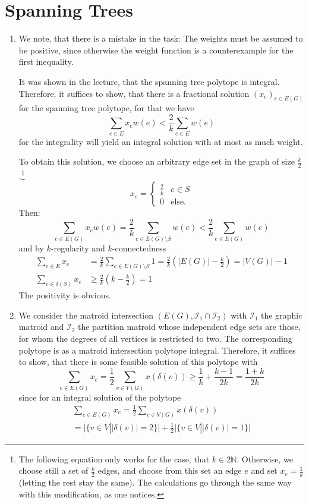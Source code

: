 \documentclass{scrartcl}
\newcommand\1{\mathbf{1}}
\begin{document}
\section{Spanning Trees}
\begin{enumerate}
\item
We note, that there is a mistake in the task: The weights must be assumed to be positive, since otherwise the weight function is a counterexample for the first inequality.

It was shown in the lecture, that the spanning tree polytope is integral. Therefore, it suffices to show, that there is a fractional solution $(x_e)_{e \in E(G)}$ for the spanning tree polytope, for that we have
\[
\sum_{e \in E} x_e w(e) < \frac{2}{k} \sum_{e \in E} w(e)
\]
for the integrality will yield an integral solution with at most as much weight.

To obtain this solution, we choose an arbitrary edge set in the graph of size $\frac{k}{2}$.\footnote{The following equation only works for the case, that $k\in 2\mathbb{N}$. Otherwise, we choose still a set of $\frac{k}{2}$ edges, and choose from this set an edge $e$ and set $x_e = \frac{1}{k}$ (letting the rest stay the same). The calculations go through the same way with this modification, as one notices.}
\[
x_e = \begin{cases} \frac{2}{k} & e \in S \\ 0 &\text{else.}\end{cases}
\]
Then:
\[
\sum_{e \in E(G)} x_e w(e) = \frac{2}{k}\sum_{e \in E(G) \setminus S} w(e) <  \frac{2}{k}\sum_{e \in E(G)} w(e)
\]
and by $k$-regularity and $k$-connectedness
\begin{align*}
\sum_{e \in E} x_e &= \frac{2}{k}\sum_{e \in E(G) \setminus S} 1 =\frac{2}{k}( \lvert E(G) \rvert - \frac{k}{2}) = \lvert V(G) \rvert -1\\
\sum_{e \in \delta (S)} x_e &\ge \frac{2}{k} (k-\frac{k}{2}) = 1
\end{align*}
The positivity is obvious.
\item
We consider the matroid intersection $(E(G), \mathcal{I}_1\cap \mathcal{I}_2)$ with $\mathcal{I}_1$ the graphic matroid and $\mathcal{I}_2$ the partition matroid whose independent edge sets are those, for whom the degrees of all vertices is restricted to two. The corresponding polytope is as a matroid intersection polytope integral. Therefore, it suffices to show, that there is some feasible solution of this polytope with
\[
\sum_{e \in E(G)} x_e = \frac{1}{2}\sum_{v \in V(G)} x(\delta(v)) \ge \frac{1}{k} + \frac{k-1}{2k}  = \frac{1+k}{2k}
\]
since for an integral solution of the polytope
\begin{multline*}
\sum_{e \in E(G)} x_e = \frac{1}{2} \sum_{v \in V(G)} x(\delta(v))\\ = \lvert\{v \in V| \lvert\delta (v)\rvert=2\}\rvert + \frac{1}{2} \lvert\{v \in V| \lvert\delta (v)\rvert=1\}\rvert
\end{multline*}
\end{enumerate}
\end{document}
